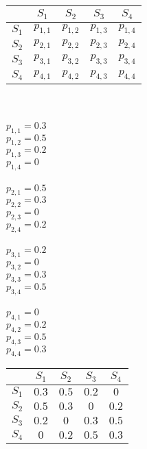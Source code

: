 \documentclass[12pt,a4paper]{report}
\begin{document}
\begin{enumerate}
\begin{enumerate}
	\begin{tabular}{ c | c | c | c | c |}
  	& $S_1$ & $S_2$ & $S_3$ & $S_4$\\ \hline
	$S_1$ & $p_{1,1}$ & $p_{1,2}$ & $p_{1,3}$ & $p_{1,4}$ \\ \hline
	$S_2$ & $p_{2,1}$ & $p_{2,2}$ & $p_{2,3}$ & $p_{2,4}$ \\ \hline
	$S_3$ & $p_{3,1}$ & $p_{3,2}$ & $p_{3,3}$ & $p_{3,4}$ \\ \hline
	$S_4$ & $p_{4,1}$ & $p_{4,2}$ & $p_{4,3}$ & $p_{4,4}$ \\ \hline
	\end{tabular}\\
	\\$p_{1,1} = 0.3$\\
	$p_{1,2} = 0.5$\\
	$p_{1,3} = 0.2$\\
	$p_{1,4} = 0$\\
	\\$p_{2,1} = 0.5$\\
	$p_{2,2} = 0.3$\\
	$p_{2,3} = 0$\\
	$p_{2,4} = 0.2$\\
	\\$p_{3,1} = 0.2$\\
	$p_{3,2} = 0$\\
	$p_{3,3} = 0.3$\\
	$p_{3,4} = 0.5$\\
	\\$p_{4,1} = 0$\\
	$p_{4,2} = 0.2$\\
	$p_{4,3} = 0.5$\\
	$p_{4,4} = 0.3$\\
	\begin{tabular}{ c | c | c | c | c |}
  	& $S_1$ & $S_2$ & $S_3$ & $S_4$\\ \hline
	$S_1$ & $0.3$ & $0.5$ & $0.2$ & $0$ \\ \hline
	$S_2$ & $0.5$ & $0.3$ & $0$ & $0.2$ \\ \hline
	$S_3$ & $0.2$ & $0$ & $0.3$ & $0.5$ \\ \hline
	$S_4$ & $0$ & $0.2$ & $0.5$ & $0.3$ \\ \hline
	\end{tabular}\\
	
\end{enumerate}


\end{enumerate}
\end{document}
